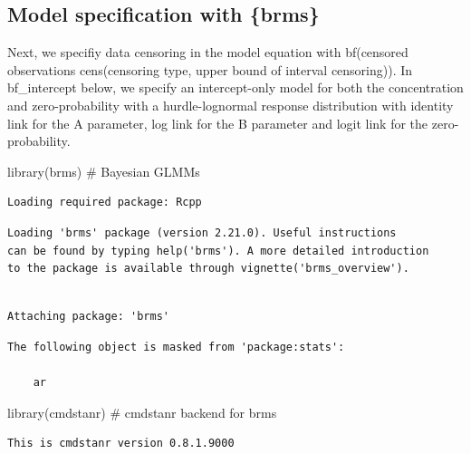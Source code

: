 \documentclass[
]{article}
\newenvironment{Shaded}{\begin{snugshade}}{\end{snugshade}}
\newcommand{\CommentTok}[1]{\textcolor[rgb]{0.37,0.37,0.37}{#1}}
\newcommand{\FunctionTok}[1]{\textcolor[rgb]{0.28,0.35,0.67}{#1}}
\newcommand{\NormalTok}[1]{\textcolor[rgb]{0.00,0.23,0.31}{#1}}
\begin{document}
\subsection{Model specification with
\{brms\}}\label{model-specification-with-brms}

Next, we specifiy data censoring in the model equation with bf(censored
observations \textbar{} cens(censoring type, upper bound of interval
censoring)). In bf\_intercept below, we specify an intercept-only model
for both the concentration and zero-probability with a hurdle-lognormal
response distribution with identity link for the A parameter, log link
for the B parameter and logit link for the zero-probability.

\begin{Shaded}
\begin{Highlighting}[]
\FunctionTok{library}\NormalTok{(brms)       }\CommentTok{\# Bayesian GLMMs}
\end{Highlighting}
\end{Shaded}

\begin{verbatim}
Loading required package: Rcpp
\end{verbatim}

\begin{verbatim}
Loading 'brms' package (version 2.21.0). Useful instructions
can be found by typing help('brms'). A more detailed introduction
to the package is available through vignette('brms_overview').
\end{verbatim}

\begin{verbatim}

Attaching package: 'brms'
\end{verbatim}

\begin{verbatim}
The following object is masked from 'package:stats':

    ar
\end{verbatim}

\begin{Shaded}
\begin{Highlighting}[]
\FunctionTok{library}\NormalTok{(cmdstanr)   }\CommentTok{\# cmdstanr backend for brms}
\end{Highlighting}
\end{Shaded}

\begin{verbatim}
This is cmdstanr version 0.8.1.9000
\end{verbatim}
\end{document}
